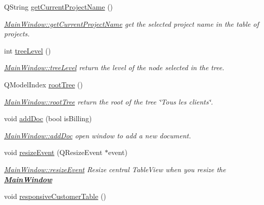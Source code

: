 \begin{DoxyCompactItemize}
Q\-String \hyperlink{classGui_1_1MainWindow_af83b009038b41bc676d15cb9bcfd5a39}{get\-Current\-Project\-Name} ()
\begin{DoxyCompactList}\small\item\em \hyperlink{classGui_1_1MainWindow_af83b009038b41bc676d15cb9bcfd5a39}{Main\-Window\-::get\-Current\-Project\-Name} get the selected project name in the table of projects. \end{DoxyCompactList}\item 
int \hyperlink{classGui_1_1MainWindow_a382370c8f119d99d409b1b5708a3e846}{tree\-Level} ()
\begin{DoxyCompactList}\small\item\em \hyperlink{classGui_1_1MainWindow_a382370c8f119d99d409b1b5708a3e846}{Main\-Window\-::tree\-Level} return the level of the node selected in the tree. \end{DoxyCompactList}\item 
Q\-Model\-Index \hyperlink{classGui_1_1MainWindow_ad2b58d18473d125b431ee0974c905748}{root\-Tree} ()
\begin{DoxyCompactList}\small\item\em \hyperlink{classGui_1_1MainWindow_ad2b58d18473d125b431ee0974c905748}{Main\-Window\-::root\-Tree} return the root of the tree \char`\"{}\-Tous les
clients\char`\"{}. \end{DoxyCompactList}\item 
void \hyperlink{classGui_1_1MainWindow_adf04c63032d4014163797ca73041511f}{add\-Doc} (bool is\-Billing)
\begin{DoxyCompactList}\small\item\em \hyperlink{classGui_1_1MainWindow_adf04c63032d4014163797ca73041511f}{Main\-Window\-::add\-Doc} open window to add a new document. \end{DoxyCompactList}\item 
void \hyperlink{classGui_1_1MainWindow_a7c85d2a0d68c046fa678bdc12feef96d}{resize\-Event} (Q\-Resize\-Event $\ast$event)
\begin{DoxyCompactList}\small\item\em \hyperlink{classGui_1_1MainWindow_a7c85d2a0d68c046fa678bdc12feef96d}{Main\-Window\-::resize\-Event} Resize central Table\-View when you resize the {\bfseries \hyperlink{classGui_1_1MainWindow}{Main\-Window}} \end{DoxyCompactList}\item 
\hypertarget{classGui_1_1MainWindow_a0bf829effb9cb3e42ba063335a15cf3d}{void \hyperlink{classGui_1_1MainWindow_a0bf829effb9cb3e42ba063335a15cf3d}{responsive\-Customer\-Table} ()}\label{classGui_1_1MainWindow_a0bf829effb9cb3e42ba063335a15cf3d}


\end{DoxyCompactItemize}
